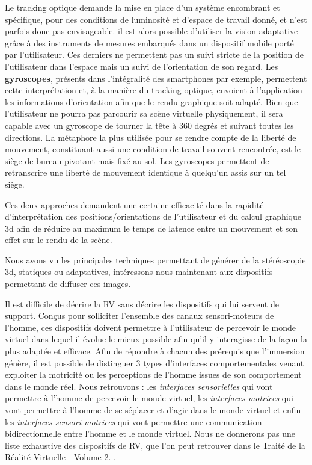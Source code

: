 Le tracking optique demande la mise en place d'un système encombrant et spécifique, pour des conditions de luminosité et d'espace de travail donné, et n'est parfois donc pas envisageable. il est alors possible d'utiliser la vision adaptative grâce à des instruments de mesures embarqués dans un dispositif mobile porté par l'utilisateur. Ces derniers ne permettent pas un suivi stricte de la position de l'utilisateur dans l'espace mais un suivi de l'orientation de son regard. Les \textbf{gyroscopes}, présents dans l'intégralité des smartphones par exemple, permettent cette interprétation et, à la manière du tracking optique, envoient à l'application les informations d'orientation afin que le rendu graphique soit adapté. Bien que l'utilisateur ne pourra pas parcourir sa scène virtuelle physiquement, il sera capable avec un gyroscope de tourner la tête à 360 degrés et suivant toutes les directions. La métaphore la plus utilisée pour se rendre compte de la liberté de mouvement, constituant aussi une condition de travail souvent rencontrée, est le siège de bureau pivotant mais fixé au sol. Les gyroscopes permettent de retranscrire une liberté de mouvement identique à quelqu'un assis sur un tel siège. 

Ces deux approches demandent une certaine efficacité dans la rapidité d'interprétation des positions/orientations de l'utilisateur et du calcul graphique 3d afin de réduire au maximum le temps de latence entre un mouvement et son effet sur le rendu de la scène.  

Nous avons vu les principales techniques permettant de générer de la stéréoscopie 3d, statiques ou adaptatives, intéressons-nous maintenant aux dispositifs permettant de diffuser ces images.

 \label{dispositifs_RV}


Il est difficile de décrire la RV sans décrire les dispositifs qui lui servent de support. Conçus pour solliciter l'ensemble des canaux sensori-moteurs de l'homme, ces dispositifs doivent permettre à l'utilisateur de percevoir le monde virtuel dans lequel il évolue le mieux possible afin qu'il y interagisse de la façon la plus adaptée et efficace.
Afin de répondre à chacun des prérequis que l'immersion génère, il est possible de distinguer 3 types d'interfaces comportementales venant exploiter la motricité ou les perceptions de l'homme issues de son comportement dans le monde réel.
Nous retrouvons : les \textit{interfaces sensorielles} qui vont permettre à l'homme de percevoir le monde virtuel, les \textit{interfaces motrices} qui vont permettre à l'homme de se séplacer et d'agir dans le monde virtuel et enfin les \textit{interfaces sensori-motrices} qui vont permettre une communication bidirectionnelle entre l'homme et le monde virtuel.
Nous ne donnerons pas une liste exhaustive des dispositifs de RV, que l'on peut retrouver dans le Traité de la Réalité Virtuelle - Volume 2. \cite{fuchs2006traite}.

